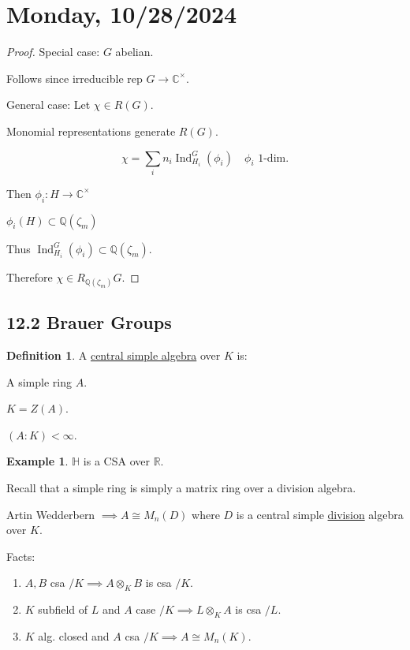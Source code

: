 \documentclass{article}
\theoremstyle{definition}
\newtheorem*{example}{Example}
\newtheorem*{definition}{Definition}
\begin{document}
\section*{Monday, 10/28/2024}

\begin{proof}
    Special case: \(G\) abelian.

    Follows since irreducible rep \(G \to \mathbb{C}^\times\).

    General case: Let \(\chi\in R(G)\).

    Monomial representations generate \(R(G)\).

    \[
        \chi = \sum_{i} n_i \operatorname{Ind}_{H_{i}}^G(\phi_i) \quad \phi_i \text{ 1-dim}.
    \]

    Then \(\phi_i : H \to \mathbb{C}^\times\)

    \(\phi_i(H) \subset \mathbb{Q}(\zeta_m)\) 

    Thus \(\operatorname{Ind}_{H_i}^G(\phi_i) \subset \mathbb{Q}(\zeta_m)\).

    Therefore \(\chi\in R_{\mathbb{Q}(\zeta_m)}G\).
\end{proof}

\subsection*{12.2 Brauer Groups}

\begin{definition}
    A \underline{central simple algebra} over \(K\) is:

    A simple ring \(A\).

    \(K = Z(A)\).

    \((A : K) < \infty\).
\end{definition}

\begin{example}
    \(\mathbb{H}\) is a CSA over \(\mathbb{R}\).
\end{example}

Recall that a simple ring is simply a matrix ring over a division algebra.

Artin Wedderbern \(\implies A \cong M_n(D)\) where \(D\) is a  central simple \underline{division} algebra over \(K\).

Facts:

\begin{enumerate}[label=\arabic*)]
    \item \(A,B\) csa \(/ K \implies A \otimes_K B\) is csa \(/ K\).
    \item \(K\) subfield of \(L\) and \(A\) case \(/ K \implies  L \otimes_K A\) is csa \(/ L\).
    \item \(K\) alg. closed and \(A\) csa \(/ K \implies A \cong M_n(K)\). 
\end{enumerate} 
\end{document}
